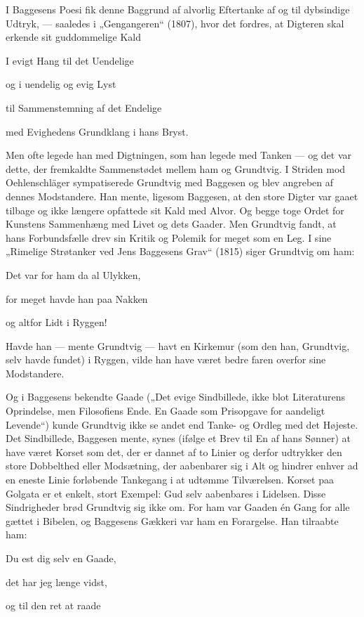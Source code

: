 \documentclass[12pt,a4paper,openany]{book}
\newcommand{\opage}[1]{\marginnote{\footnotesize\textit{[#1]}}}
\begin{document}
I Baggesens Poesi fik denne Baggrund af alvorlig Eftertanke af og til
dybsindige Udtryk, --- saaledes i „Gengangeren“ (1807), hvor det fordres, at
Digteren skal erkende sit guddommelige Kald

I evigt Hang til det Uendelige

og i uendelig og evig Lyst

til Sammenstemning af det Endelige

med Evighedens Grundklang i hans Bryst.

Men ofte legede han med Digtningen, som han legede med Tanken --- og det var
dette, der fremkaldte Sammenstødet mellem ham og Grundtvig. I Striden mod
Oehlenschläger sympatiserede Grundtvig med Baggesen og blev angreben af dennes
Modstandere. Han mente, ligesom Baggesen, at den store Digter var gaaet tilbage
og ikke længere opfattede sit Kald med Alvor. Og begge toge Ordet for Kunstens
Sammenhæng med Livet og dets Gaader. Men Grundtvig fandt, at hans Forbundsfælle
drev sin Kritik og Polemik for meget som en Leg. I sine „Rimelige Strøtanker
ved Jens Baggesens Grav“ (1815) siger Grundtvig om ham:

\setcounter{footnote}{0}%
\opage{69}Det var for ham da al Ulykken,

for meget havde han paa Nakken

og altfor Lidt i Ryggen!

Havde han --- mente Grundtvig --- havt en Kirkemur (som den han, Grundtvig,
selv havde fundet) i Ryggen, vilde han have været bedre faren overfor sine
Modstandere.

Og i Baggesens bekendte Gaade („Det evige Sindbillede, ikke blot Literaturens
Oprindelse, men Filosofiens Ende. En Gaade som Prisopgave for aandeligt
Levende“) kunde Grundtvig ikke se andet end Tanke- og Ordleg med det Højeste.
Det Sindbillede, Baggesen mente, synes (ifølge et Brev til En af hans Sønner)
at have været Korset som det, der er dannet af to Linier og derfor udtrykker
den store Dobbelthed eller Modsætning, der aabenbarer sig i Alt og hindrer
enhver ad en eneste Linie forløbende Tankegang i at udtømme Tilværelsen. Korset
paa Golgata er et enkelt, stort Exempel: Gud selv aabenbares i Lidelsen. Disse
Sindrigheder brød Grundtvig sig ikke om. For ham var Gaaden én Gang for alle
gættet i Bibelen, og Baggesens Gækkeri var ham en Forargelse. Han tilraabte ham:

Du est dig selv en Gaade,

det har jeg længe vidst,

og til den ret at raade
\end{document}
